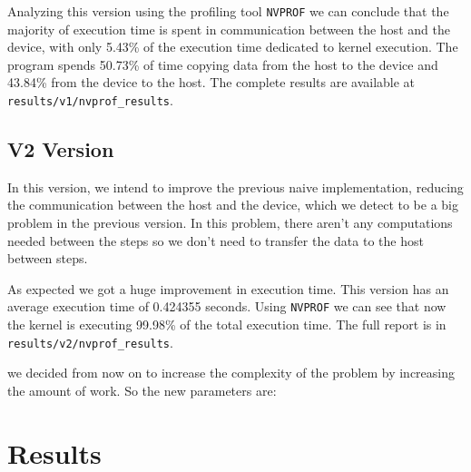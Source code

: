 \documentclass[conference]{IEEEtran}
\begin{document}
Analyzing this version using the profiling tool \texttt{NVPROF} we can conclude that the majority of execution time is spent in communication between the host and the device, with only 5.43\% of the execution time dedicated to kernel execution. The program spends 50.73\% of time copying data from the host to the device and 43.84\% from the device to the host. The complete results are available at \texttt{results/v1/nvprof\_results}.

\subsection{V2 Version}
In this version, we intend to improve the previous naive implementation, reducing the communication between the host and the device, which we detect to be a big problem in the previous version. In this problem, there aren't any computations needed between the steps so we don't need to transfer the data to the host between steps.

As expected we got a huge improvement in execution time. This version has an average execution time of 0.424355 seconds. Using \texttt{NVPROF} we can see that now the kernel is executing 99.98\% of the total execution time. The full report is in \texttt{results/v2/nvprof\_results}.

we decided from now on to increase the complexity of the problem by increasing the amount of work. So the new parameters are:




\section{Results}
\end{document}

